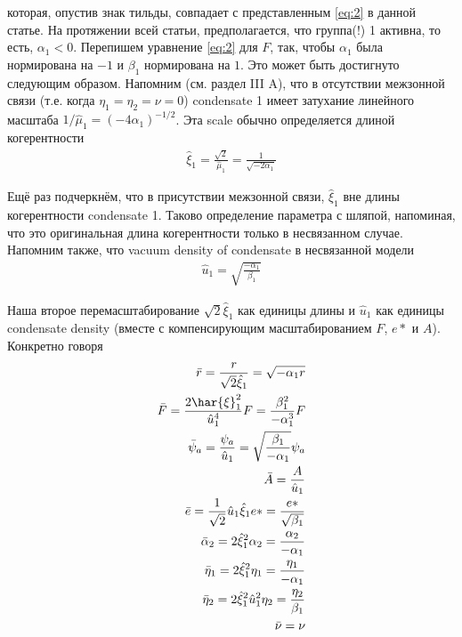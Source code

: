 которая, опустив знак тильды, совпадает с представленным \eqref{eq:2} в 
данной статье. На протяжении всей статьи, предполагается, что группа(!) 1 
активна, то есть, \( \alpha_1 < 0 \). Перепишем уравнение \eqref{eq:2} для 
\( F \), так, чтобы \( \alpha_1 \) была нормирована на \( -1 \) и 
\( \beta_1 \) нормирована на \( 1 \). Это может быть достигнуто следующим 
образом. Напомним (см. раздел III A), что в отсутствии межзонной связи (т.е. 
когда \( \eta_1 = \eta_2 = \nu = 0 \)) condensate 1 имеет затухание линейного 
масштаба \( 1/\hat{\mu}_1 = (-4\alpha_1)^{-1/2} \). Эта scale обычно 
определяется длиной когерентности
\begin{align*}
	\hat{\xi}_1 = \frac{\sqrt{2}}{\hat{\mu}_1} = \frac{1}{\sqrt{-2\alpha_1}}
\end{align*} %

Ещё раз подчеркнём, что в присутствии межзонной связи, \( \hat{\xi}_1 \) вне 
длины когерентности condensate 1. Таково определение параметра с шляпой, 
напоминая, что это оригинальная длина когерентности только в несвязанном 
случае. Напомним также, что vacuum density of condensate в несвязанной модели 
\begin{align*}
	\hat{u}_1 = \sqrt{\frac{-\alpha_1}{\beta_1}}
\end{align*} %

Наша второе перемасштабирование \( \sqrt{2}\hat{\xi}_1 \) как единицы длины 
и \( \hat{u}_1 \) как единицы condensate density (вместе с компенсирующим 
масштабированием \( F \), \( e* \) и \( A \)). Конкретно говоря
\begin{align*}
	\bar{r} = \frac{r}{\sqrt{2}\hat{\xi}_1} = \sqrt{-\alpha_1 r} \\
	\bar{F} = \frac{2\har{\xi}^2_1}{\hat{u}^4_1}F = 
		\frac{\beta^2_1}{-\alpha^3_1}F \\
	\bar{\psi}_a = \frac{\psi_a}{\hat{u}_1} = 
		\sqrt{\frac{\beta_1}{-\alpha_1}}\psi_a \\
	\bar{A} = \frac{A}{\hat{u}_1} \\
	\bar{e} = \frac{1}{\sqrt{2}}\hat{u}_1\hat{\xi}_1 e* = 
		\frac{e*}{\sqrt{\beta_1}} \\
	\bar{\alpha}_2 = 2\hat{\xi}^2_1 \alpha_2 = \frac{\alpha_2}{-\alpha_1} \\
	\bar{\eta}_1 = 2\hat{\xi}^2_1 \eta_1 = \frac{\eta_1}{-\alpha_1} \\
	\bar{\eta}_2 = 2\hat{\xi}^2_1 \hat{u}^2_1 \eta_2 = 
		\frac{\eta_2}{\beta_1} \\
	\bar{\nu} = \nu
\end{align*} %

